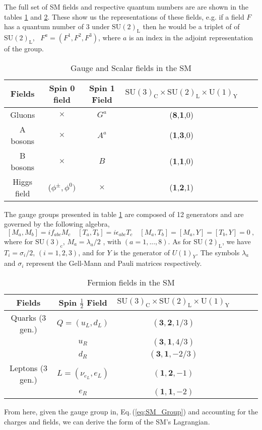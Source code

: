 The full set of SM fields and respective quantum numbers are are shown in the tables \ref{table1} and \ref{table2}. These show us the representations of these fields, e.g. if a field $F$ has a quantum number of 3 under $\mathrm{SU(2)_L}$ then he would be a triplet of of $\mathrm{SU(2)_L}$, \ $F^a = (F^1,F^2,F^3)$, where $a$ is an index in the adjoint representation of the group.   
%
\begin{table}[H]
\centering
\caption{Gauge and Scalar fields in the SM}
\label{table1}
\begin{tabular}{@{}cccccc@{}}
  \hline	
 Fields & Spin 0 field & Spin 1 Field & $ \mathrm{ SU(3)_C \times SU(2)_L \times U(1)_Y } $  \\
  \hline	
 Gluons  & $\times$  & $G^a$ & (\textbf{8},\textbf{1},0) \\	
A bosons & $\times$  & $A^a$ & (\textbf{1},\textbf{3},0)   \\
B bosons & $\times$  & $B$   & (\textbf{1},\textbf{1},0)   \\
Higgs field & ($\phi^\pm, \phi^0 )$  & $\times$ & (\textbf{1},\textbf{2},1) \\ \hline
\end{tabular}
\end{table}
%
The gauge groups presented in table \ref{table1} are composed of 12 generators and are governed by the following algebra, 
% 
\begin{equation}
\left[ M_a , M_b \right] = i f_{abc} M_c \quad \left[ T_a , T_b \right ] = i \epsilon_{abc} T_c \quad \left[ M_a , T_b \right] = \left[ M_a , Y \right] = \left[ T_b,Y \right] = 0  \ , 
\end{equation}
%
where for $\mathrm{SU(3)_c}$, $M_a = {\lambda_a}/{2}$ , with $(a = 1, . . . , 8)$. As for $\mathrm{SU(2)_L}$, we have $T_i= \sigma_i/{2} $, $(i = 1, 2, 3)$, and for $Y$ is the generator of $U(1)_Y$. The symbols $\lambda_a$ and $\sigma_i$ represent the Gell-Mann and Pauli matrices respectively. 
%
\begin{table}[H]
\centering
\caption{Fermion fields in the SM}
\label{table2}
\begin{tabular}{@{}cccccc@{}}
  \hline	
 Fields & Spin $\frac{1}{2}$ Field & $\mathrm{ SU(3)_C \times SU(2)_L \times U(1)_Y} $   \\
  \hline	
Quarks (3 gen.) & $Q=(u_L,d_L)$ & $(\mathbf{3},\mathbf{2},{1}/{3})$ \\	
$\quad$        & $u_R$ & $(\mathbf{3},\mathbf{1},{4}/{3})$   \\
$\quad$   & $d_R$ & $(\mathbf{3},\mathbf{1}, -{2}/{3})$   \\
Leptons (3 gen.) & $L=(\nu_{e_L}, e_L )$ & $(\mathbf{1},\mathbf{2},-1)$  \\
$\quad$   & $e_R$ & $(\mathbf{1},\mathbf{1},-2)   $ \\ \hline
%
\end{tabular}
\end{table}
%
From here, given the gauge group in, Eq.\,(\ref{eq:SM_Group}) and accounting for the charges and fields, we can derive the form of the SM's Lagrangian. 



